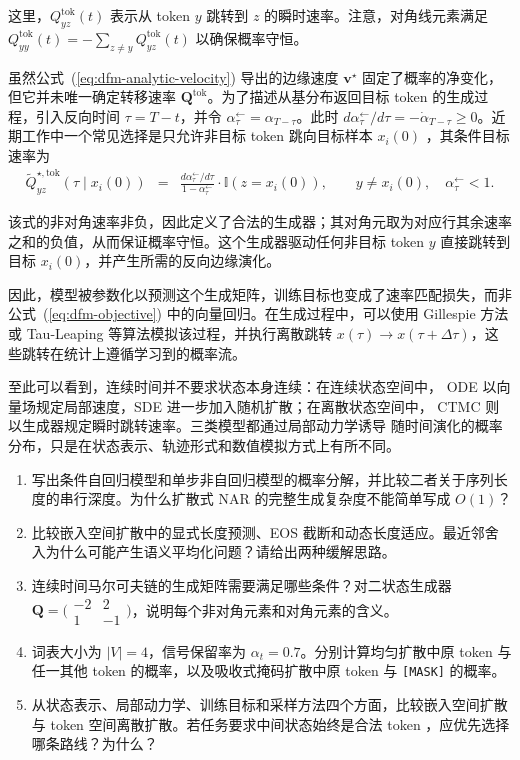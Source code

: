\documentclass[UTF8,a4paper,zihao=-4,oneside,openany]{ctexbook}
\begin{document}
\noindent 这里，$Q^{\mathrm{tok}}_{yz}(t)$ 表示从 token $y$ 跳转到 $z$ 的瞬时速率。注意，对角线元素满足 $Q^{\mathrm{tok}}_{yy}(t) = - \sum_{z \neq y} Q^{\mathrm{tok}}_{yz}(t)$ 以确保概率守恒。

虽然公式~(\ref{eq:dfm-analytic-velocity}) 导出的边缘速度 $\mathbf{v}^\star$ 固定了概率的净变化，但它并未唯一确定转移速率 $\mathbf{Q}^{\mathrm{tok}}$。为了描述从基分布返回目标 token 的生成过程，引入反向时间 $\tau=T-t$，并令 $\alpha^\leftarrow_\tau=\alpha_{T-\tau}$。此时 $d\alpha^\leftarrow_\tau/d\tau=-\dot{\alpha}_{T-\tau}\geq0$。近期工作中一个常见选择是只允许非目标 token 跳向目标样本 $x_i(0)$ \citep{campbell-etal:2024generative}，其条件目标速率为
\begin{eqnarray}
\widetilde Q^{\star,\mathrm{tok}}_{yz}(\tau\mid x_i(0))
&=&
\frac{d\alpha^\leftarrow_\tau/d\tau}{1-\alpha^\leftarrow_\tau}
\cdot\mathbb{I}(z=x_i(0)),
\qquad y\ne x_i(0),\quad \alpha^\leftarrow_\tau<1.
\label{eq:target-Q}
\end{eqnarray}

\noindent 该式的非对角速率非负，因此定义了合法的生成器；其对角元取为对应行其余速率之和的负值，从而保证概率守恒。这个生成器驱动任何非目标 token $y$ 直接跳转到目标 $x_i(0)$，并产生所需的反向边缘演化。

因此，模型被参数化以预测这个生成矩阵，训练目标也变成了速率匹配损失，而非公式~(\ref{eq:dfm-objective}) 中的向量回归。在生成过程中，可以使用 Gillespie 方法 \citep{gillespie:1977exact} 或 Tau-Leaping \citep{gillespie:2001approximate} 等算法模拟该过程，并执行离散跳转 $x(\tau) \to x(\tau+\Delta \tau)$，这些跳转在统计上遵循学习到的概率流。

至此可以看到，连续时间并不要求状态本身连续：在连续状态空间中，
ODE 以向量场规定局部速度，SDE 进一步加入随机扩散；在离散状态空间中，
CTMC 则以生成器规定瞬时跳转速率。三类模型都通过局部动力学诱导
随时间演化的概率分布，只是在状态表示、轨迹形式和数值模拟方式上有所不同。

\begin{exercisebox}
  \begin{enumerate}
    \item 写出条件自回归模型和单步非自回归模型的概率分解，并比较二者关于序列长度的串行深度。为什么扩散式 NAR 的完整生成复杂度不能简单写成 \(O(1)\)？
    \item 比较嵌入空间扩散中的显式长度预测、EOS 截断和动态长度适应。最近邻舍入为什么可能产生语义平均化问题？请给出两种缓解思路。
    \item 连续时间马尔可夫链的生成矩阵需要满足哪些条件？对二状态生成器 \(\boldsymbol Q=\bigl(\begin{smallmatrix}-2&2\\1&-1\end{smallmatrix}\bigr)\)，说明每个非对角元素和对角元素的含义。
    \item 词表大小为 \(|V|=4\)，信号保留率为 \(\alpha_t=0.7\)。分别计算均匀扩散中原 token 与任一其他 token 的概率，以及吸收式掩码扩散中原 token 与 \texttt{[MASK]} 的概率。
    \item 从状态表示、局部动力学、训练目标和采样方法四个方面，比较嵌入空间扩散与 token 空间离散扩散。若任务要求中间状态始终是合法 token ，应优先选择哪条路线？为什么？
  \end{enumerate}
\end{exercisebox}
\end{document}
